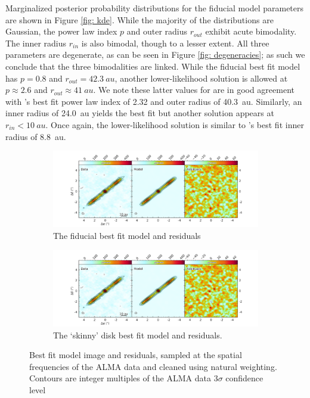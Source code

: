 \documentclass[12pt,oneside]{article}
\begin{document}
Marginalized posterior probability distributions for the fiducial model parameters are shown in Figure \ref{fig: kde}. 
While the majority of the distributions are Gaussian, the power law index $p$ and outer radius $r_{out}$ exhibit acute bimodality. 
The inner radius $r_{in}$ is also bimodal, though to a lesser extent.
All three parameters are degenerate, as can be seen in Figure \ref{fig: degeneracies}; as such we conclude that the three bimodalities are linked.
While the fiducial best fit model has $p=0.8$ and $r_{out}=\SI{42.3}{au}$, another lower-likelihood solution is allowed at $p \approx 2.6$ and $r_{out} \approx \SI{41}{au}$.
We note these latter values for are in good agreement with \cite{macgregor13}'s best fit power law index of 2.32 and outer radius of \SI{40.3}{au}.
Similarly, an inner radius of \SI{24.0}{au} yields the best fit but another solution appears at $r_{in} < \SI{10}{au}$.
Once again, the lower-likelihood solution is similar to \cite{macgregor13}'s best fit inner radius of \SI{8.8}{au}.

\begin{figure}
  
  \begin{subfigure}[b]{\linewidth}
  \includegraphics[width=\linewidth]{figures/fiducial_best_fit}
  \caption{The fiducial best fit model and residuals}
  \label{fig: fiducial}
  \end{subfigure}
  
  \begin{subfigure}[b]{\linewidth}
  \includegraphics[width=\linewidth]{figures/skinny_best_fit}
  \caption{The `skinny' disk best fit model and residuals.}
  \label{fig: skinny}
  \end{subfigure}
  \caption{Best fit model image and residuals, sampled at the spatial frequencies of the ALMA data and cleaned using natural weighting. Contours are integer multiples of the ALMA data $3\sigma$ confidence level}
\end{figure}
\end{document}
